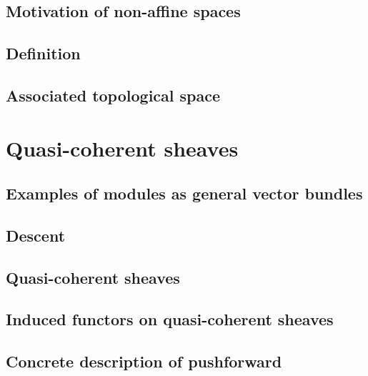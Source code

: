\documentclass{article}
\begin{document}
  \subsection{Motivation of non-affine spaces}
    
  \subsection{Definition}
  \subsection{Associated topological space}

\section{Quasi-coherent sheaves}
  \subsection{Examples of modules as general vector bundles}
    
  \subsection{Descent}
  \subsection{Quasi-coherent sheaves}
    
  \subsection{Induced functors on quasi-coherent sheaves}
    
  \subsection{Concrete description of pushforward}
    
\end{document}
